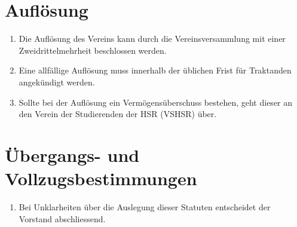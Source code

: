 \documentclass[10pt,a4paper,parskip,fleqn]{scrartcl}
\newcommand{\ol}{\begin{enumerate}[itemsep=-0.2em,topsep=-0.2em]}
\newcommand{\lo}{\end{enumerate}}
\newcommand{\li}{\item}
\begin{document}
\section{Auflösung}

\ol
  \li Die Auflösung des Vereins kann durch die Vereinsversammlung mit einer
  Zweidrittelmehrheit beschlossen werden.
  \li Eine allfällige Auflösung muss innerhalb der üblichen Frist für Traktanden
  angekündigt werden.
  \li Sollte bei der Auflösung ein Vermögensüberschuss bestehen, geht dieser an
  den Verein der Studierenden der HSR (VSHSR) über.
\lo


\section{Übergangs- und Vollzugsbestimmungen}

\ol
  \li Bei Unklarheiten über die Auslegung dieser Statuten entscheidet der
  Vorstand abschliessend.
\lo
\end{document}
